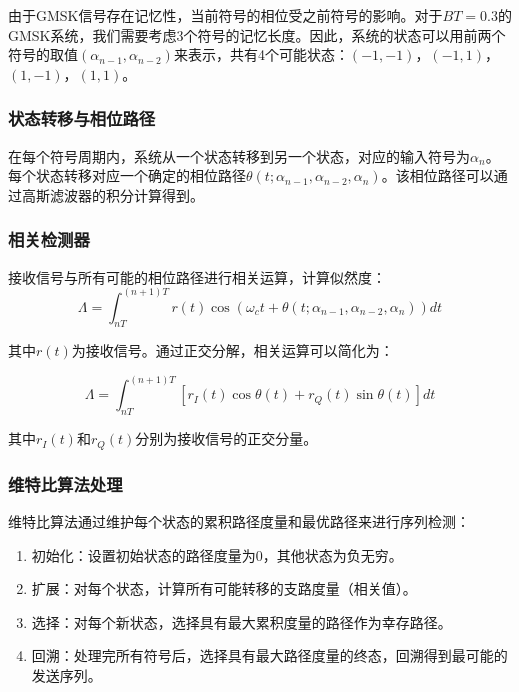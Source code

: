 \documentclass[12pt,a4paper,twoside]{article}
\numberwithin{equation}{section}
\begin{document}
由于GMSK信号存在记忆性，当前符号的相位受之前符号的影响。对于$BT=0.3$的GMSK系统，我们需要考虑3个符号的记忆长度。因此，系统的状态可以用前两个符号的取值$(\alpha_{n-1}, \alpha_{n-2})$来表示，共有4个可能状态：$(-1,-1)$，$(-1,1)$，$(1,-1)$，$(1,1)$。

\subsubsection{状态转移与相位路径}

在每个符号周期内，系统从一个状态转移到另一个状态，对应的输入符号为$\alpha_n$。每个状态转移对应一个确定的相位路径$\theta(t; \alpha_{n-1}, \alpha_{n-2}, \alpha_n)$。该相位路径可以通过高斯滤波器的积分计算得到。

\subsubsection{相关检测器}

接收信号与所有可能的相位路径进行相关运算，计算似然度：
\begin{equation}
    \Lambda = \int_{nT}^{(n+1)T} r(t) \cos(\omega_c t + \theta(t; \alpha_{n-1}, \alpha_{n-2}, \alpha_n)) dt
\end{equation}

其中$r(t)$为接收信号。通过正交分解，相关运算可以简化为：

\begin{equation}
    \Lambda = \int_{nT}^{(n+1)T} [r_I(t)\cos\theta(t) + r_Q(t)\sin\theta(t)] dt
\end{equation}

其中$r_I(t)$和$r_Q(t)$分别为接收信号的正交分量。

\subsubsection{维特比算法处理}

维特比算法通过维护每个状态的累积路径度量和最优路径来进行序列检测：

\begin{enumerate}
    \item 初始化：设置初始状态的路径度量为0，其他状态为负无穷。
    \item 扩展：对每个状态，计算所有可能转移的支路度量（相关值）。
    \item 选择：对每个新状态，选择具有最大累积度量的路径作为幸存路径。
    \item 回溯：处理完所有符号后，选择具有最大路径度量的终态，回溯得到最可能的发送序列。
\end{enumerate}
\end{document}
